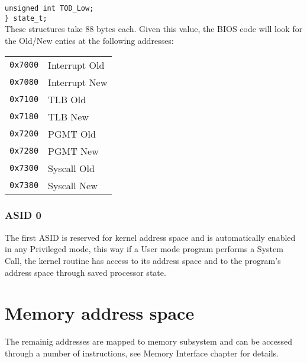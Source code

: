 \nopagebreak
\texttt{unsigned int TOD\_Low;}\\
\nopagebreak
\texttt{\} state\_t; }
\\

These structures take 88 bytes each. Given this value, the BIOS code will look for the Old/New enties at the following addresses:
\\

\begin{tabular}{r|l}
\texttt{0x7000} & Interrupt Old \\
\texttt{0x7080} & Interrupt New \\
\texttt{0x7100} & TLB Old \\
\texttt{0x7180} & TLB New \\
\texttt{0x7200} & PGMT Old \\
\texttt{0x7280} & PGMT New \\
\texttt{0x7300} & Syscall Old \\
\texttt{0x7380} & Syscall New \\
\end{tabular}

\subsubsection{ASID 0}
The first ASID is reserved for kernel address space and is automatically enabled in any Privileged mode, this way if a User mode program performs a System Call, the kernel routine has access to its address space and to the program's address space through saved processor state.

\section{Memory address space}

The remainig addresses are mapped to memory subsystem and can be accessed through a number of instructions, see Memory Interface chapter for details.
